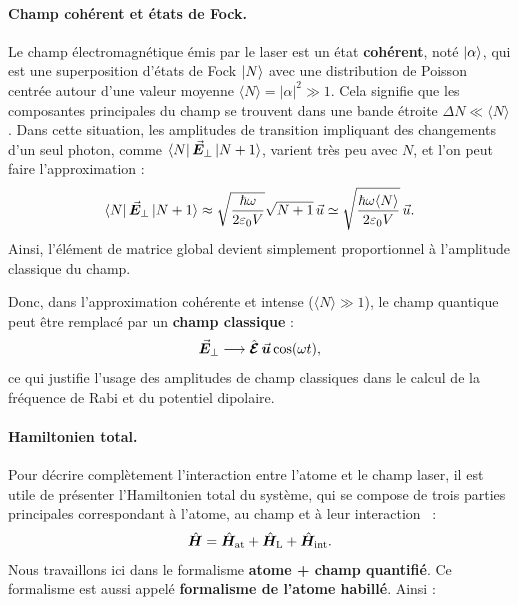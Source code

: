 \medskip


\paragraph{Champ cohérent et états de Fock.} Le champ électromagnétique émis par le laser est un état \textbf{cohérent}, noté \( \ket{\alpha} \), qui est une superposition d’états de Fock \( \ket{N} \) avec une distribution de Poisson centrée autour d’une valeur moyenne \( \langle N \rangle  = \vert \alpha \vert ^2 \gg 1 \). Cela signifie que les composantes principales du champ se trouvent dans une bande étroite \( \Delta N \ll \langle N \rangle \). Dans cette situation, les amplitudes de transition impliquant des changements d’un seul photon, comme \( \bra{N} \vec{{\bm{E}}}_\perp \ket{N+1} \), varient très peu avec \( N \), et l’on peut faire l’approximation :
\begin{eqnarray}
\bra{N} \vec{{\bm{E}}}_\perp \ket{N+1} \approx \sqrt{\frac{\hbar \omega}{2\varepsilon_0 V}}  \sqrt{N+1} \, \vec{u} \simeq \sqrt{\frac{\hbar \omega \langle N \rangle}{2\varepsilon_0 V}} \, \vec{u} .
\end{eqnarray}
Ainsi, l’élément de matrice global devient simplement proportionnel à l’amplitude classique du champ.

Donc, dans l’approximation cohérente et intense (\(\langle N \rangle \gg 1\)), le champ quantique peut être remplacé par un {\bf champ classique}  :
\begin{equation}
	\vec{{\bm{E}}}_\perp \longrightarrow  \hat{\bm{\mathcal{E}}} \, \vec{{\bm{u}}} \cos(\omega t),
\end{equation}
ce qui justifie l’usage des amplitudes de champ classiques dans le calcul de la fréquence de Rabi et du potentiel dipolaire.

\medskip

\paragraph{Hamiltonien total.}
Pour décrire complètement l'interaction entre l'atome et le champ laser, il est utile de présenter l'Hamiltonien total du système, qui se compose de trois parties principales correspondant à l'atome, au champ et à leur interaction~\cite{CohenTannoudji1988} :
\begin{eqnarray}
\hat{\bm{H}} = \hat{\bm{H}}_{\mathrm{at}} + \hat{\bm{H}}_{\mathrm{L}} + \hat{\bm{H}}_{\mathrm{int}}.	
\end{eqnarray}
Nous travaillons ici dans le formalisme {\bf atome + champ quantifié}. Ce formalisme est aussi appelé {\bf formalisme de l’atome habillé}. Ainsi :

